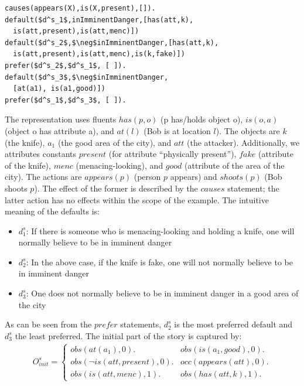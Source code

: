 \documentclass{article}
\begin{document}
\begin{lstlisting}[language=clingo,numbers=none,caption=Set $RD^s$ of statements for the self-defense example, label=lst:pi_S, mathescape=true,xleftmargin=.01\textwidth, breaklines=true]
causes(appears(X),is(X,present),[]).
default($d^s_1$,inImminentDanger,[has(att,k),
  is(att,present),is(att,menc)])
default($d^s_2$,$\neg$inImminentDanger,[has(att,k),
  is(att,present),is(att,menc),is(k,fake)])
prefer($d^s_2$,$d^s_1$, [ ]).
default($d^s_3$,$\neg$inImminentDanger,
  [at(a1), is(a1,good)])
prefer($d^s_1$,$d^s_3$, [ ]).
\end{lstlisting}
The representation uses fluents $has(p,o)$ (p has/holds object o), $is(o,a)$ (object o has attribute a), and $at(l)$ (Bob is at location $l$). The objects are $k$ (the knife), $a_1$ (the good area of the city), and $att$ (the attacker). Additionally, we attributes constants $present$ (for attribute ``physically present''), $fake$ (attribute of the knife), $menc$ (menacing-looking), and $good$ (attribute of the area of the city). The actions are $appears(p)$ (person $p$ appears) and $shoots(p)$ (Bob shoots $p$). The effect of the former is described by the $causes$ statement; the latter action has no effects within the scope of the example. The intuitive meaning of the defaults is:
\begin{itemize}
\item $d^s_1$: If there is someone who is menacing-looking and holding a knife, one will normally believe to be in imminent danger
\item $d^s_2$: In the above case, if the knife is fake, one will not normally believe to be in imminent danger
\item $d^s_3$: One does not normally believe to be in imminent danger in a good area of the city
\end{itemize} 
As can be seen from the $prefer$ statements, $d^s_2$ is the most preferred default and $d^s_3$ the least preferred.
The initial part of the story is captured by:
\[
\begin{array}{lll}
O^s_{init}  \!=\!  \left\{
\begin{array}{ll} 
\!\!obs(at(a_1),0).   %
&\!\! obs(is(a_1,good),0). \\
\!\!obs(\neg is(att,present),0). & \!\!
occ(appears(att),0). \\    %
\!\!obs(is(att,menc),1). &\!\!  %
obs(has(att,k),1).
\end{array}
\right.
\end{array}
\]
\end{document}
